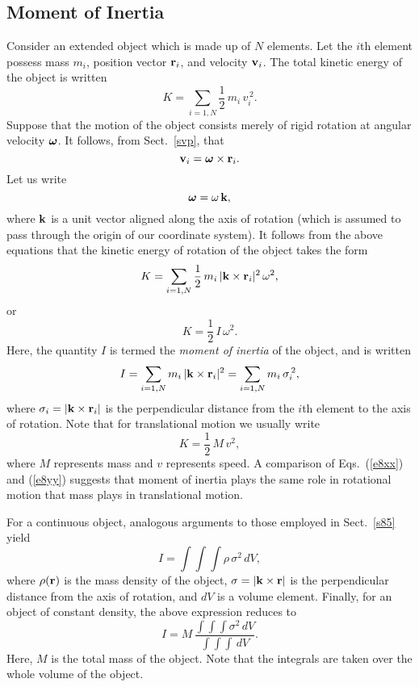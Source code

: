 \subsection{Moment of Inertia}\label{smoi}
Consider an extended object which is made up of $N$ elements. Let the $i$th element
possess mass $m_i$, position vector ${\bf r}_i$, and velocity ${\bf v}_i$. The
total kinetic energy of the object is written
\begin{equation}
K = \sum_{i=1,N} \frac{1}{2}\,m_i\,v_i^{\,2}.
\end{equation}
Suppose that the motion of the object consists merely of rigid rotation at angular
velocity $\mbox{\boldmath$\omega$}$. It follows, from Sect.~\ref{svp}, that
\begin{equation}
{\bf v}_i = \mbox{\boldmath$\omega$}\times {\bf r}_i.
\end{equation}
Let us write
\begin{equation}
\mbox{\boldmath$\omega$} = \omega\,{\bf k},
\end{equation}
where ${\bf k}$ is a unit vector aligned along the axis of rotation (which
is assumed to pass through the origin of our coordinate system). It follows from
the above equations that the kinetic energy of rotation of the object takes the
form 
\begin{equation}
K = \sum_{i=1,N} \frac{1}{2}\,m_i\,|{\bf k}\times {\bf r}_i|^2\,\omega^2,
\end{equation}
or
\begin{equation}\label{e8xx}
K = \frac{1}{2}\,I\,\omega^2.
\end{equation}
Here, the quantity $I$ is termed the {\em moment of inertia} of the object, and
is written
\begin{equation}
I = \sum_{i=1,N} m_i\,|{\bf k}\times {\bf r}_i|^2= \sum_{i=1,N} m_i\,\sigma_i^{\,2},
\end{equation}
where $\sigma_i=|{\bf k}\times {\bf r}_i|$ is the perpendicular distance from the $i$th element to the axis of
rotation. Note that for translational motion we usually write
\begin{equation}\label{e8yy}
K = \frac{1}{2}\,M\,v^2,
\end{equation}
where $M$ represents  mass and $v$ represents  speed. A comparison of
Eqs.~(\ref{e8xx}) and (\ref{e8yy}) suggests that moment of inertia plays the
same role in rotational motion that mass plays in translational motion.

For a continuous object, analogous arguments to those employed in Sect.~\ref{s85}
yield
\begin{equation}
I = \int\!\int\!\int \rho\,\sigma^2\,dV,
\end{equation}
where $\rho({\bf r})$ is the mass density of the object, $\sigma = |{\bf k}\times {\bf r}|$ is
the perpendicular distance from the axis of rotation,
and $dV$ is a volume element.
Finally, for an object of constant density, the above expression reduces to
\begin{equation}\label{e8bb}
I = M\,\frac{\int\!\int\!\int \sigma^2\,dV}
{\int\!\int\!\int \,dV}.
\end{equation}
Here, $M$ is the total mass of the object. Note that the integrals are taken over the whole
volume of the object. 

